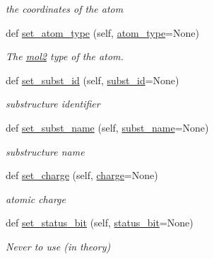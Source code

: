 \begin{DoxyCompactItemize}
\begin{DoxyCompactList}\small\item\em the coordinates of the atom \end{DoxyCompactList}\item 
def \hyperlink{classsrc_1_1Mol2_1_1mol2__atom_a57b9746cd3505288885f5595a16f24d3}{set\+\_\+atom\+\_\+type} (self, \hyperlink{classsrc_1_1Mol2_1_1mol2__atom_ab50a6f7cf343864a3c40e912e0a3c5c6}{atom\+\_\+type}=None)
\begin{DoxyCompactList}\small\item\em The \hyperlink{classsrc_1_1Mol2_1_1mol2}{mol2} type of the atom. \end{DoxyCompactList}\item 
def \hyperlink{classsrc_1_1Mol2_1_1mol2__atom_ad594fb8ce376d0d52d9aca4ce221b92f}{set\+\_\+subst\+\_\+id} (self, \hyperlink{classsrc_1_1Mol2_1_1mol2__atom_a122963f0b3e9118adce5cec8ee511603}{subst\+\_\+id}=None)
\begin{DoxyCompactList}\small\item\em substructure identifier \end{DoxyCompactList}\item 
def \hyperlink{classsrc_1_1Mol2_1_1mol2__atom_a09ce74333db903bbc0bed9f70fab5eb2}{set\+\_\+subst\+\_\+name} (self, \hyperlink{classsrc_1_1Mol2_1_1mol2__atom_a7c92307326eb6c724031a9928ac050e3}{subst\+\_\+name}=None)
\begin{DoxyCompactList}\small\item\em substructure name \end{DoxyCompactList}\item 
def \hyperlink{classsrc_1_1Mol2_1_1mol2__atom_a846b915ceaa2da59962cf5a3ff35db36}{set\+\_\+charge} (self, \hyperlink{classsrc_1_1Mol2_1_1mol2__atom_ad2ae2ab0e831e178838b5fcb900c7ad8}{charge}=None)
\begin{DoxyCompactList}\small\item\em atomic charge \end{DoxyCompactList}\item 
def \hyperlink{classsrc_1_1Mol2_1_1mol2__atom_aff9e7682fa89d21231f89653f5032c17}{set\+\_\+status\+\_\+bit} (self, \hyperlink{classsrc_1_1Mol2_1_1mol2__atom_a471ab7ca3b2c033da344fef68a570e35}{status\+\_\+bit}=None)
\begin{DoxyCompactList}\small\item\em Never to use (in theory) \end{DoxyCompactList}\end{DoxyCompactItemize}
